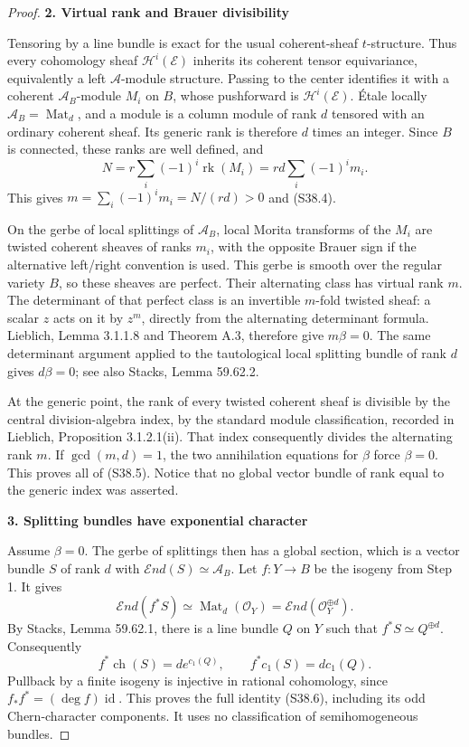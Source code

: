 \begin{proof}
\par

\medskip\noindent\textbf{2. Virtual rank and Brauer divisibility}\quad

Tensoring by a line bundle is exact for the usual coherent-sheaf \(t\)-structure. Thus every cohomology sheaf \(\mathcal H^i(\mathcal E)\) inherits its coherent tensor equivariance, equivalently a left \(\mathscr A\)-module structure. Passing to the center identifies it with a coherent \(\mathscr A_B\)-module \(M_i\) on \(B\), whose pushforward is \(\mathcal H^i(\mathcal E)\). Étale locally \(\mathscr A_B=\operatorname{Mat}_d\), and a module is a column module of rank \(d\) tensored with an ordinary coherent sheaf. Its generic rank is therefore \(d\) times an integer. Since \(B\) is connected, these ranks are well defined, and \[
 N=r\sum_i(-1)^i\operatorname{rk}(M_i)
   =rd\sum_i(-1)^i m_i.
\] This gives \(m=\sum_i(-1)^im_i=N/(rd)>0\) and (S38.4).

On the gerbe of local splittings of \(\mathscr A_B\), local Morita transforms of the \(M_i\) are twisted coherent sheaves of ranks \(m_i\), with the opposite Brauer sign if the alternative left/right convention is used. This gerbe is smooth over the regular variety \(B\), so these sheaves are perfect. Their alternating class has virtual rank \(m\). The determinant of that perfect class is an invertible \(m\)-fold twisted sheaf: a scalar \(z\) acts on it by \(z^m\), directly from the alternating determinant formula. Lieblich, Lemma 3.1.1.8 and Theorem A.3, therefore give \(m\beta=0\). The same determinant argument applied to the tautological local splitting bundle of rank \(d\) gives \(d\beta=0\); see also Stacks, Lemma 59.62.2.

At the generic point, the rank of every twisted coherent sheaf is divisible by the central division-algebra index, by the standard module classification, recorded in Lieblich, Proposition 3.1.2.1(ii). That index consequently divides the alternating rank \(m\). If \(\gcd(m,d)=1\), the two annihilation equations for \(\beta\) force \(\beta=0\). This proves all of (S38.5). Notice that no global vector bundle of rank equal to the generic index was asserted.

\par

\medskip\noindent\textbf{3. Splitting bundles have exponential character}\quad

Assume \(\beta=0\). The gerbe of splittings then has a global section, which is a vector bundle \(S\) of rank \(d\) with \(\mathcal End(S)\simeq\mathscr A_B\). Let \(f:Y\to B\) be the isogeny from Step 1. It gives \[
 \mathcal End(f^*S)\simeq\operatorname{Mat}_d(\mathcal O_Y)
                      =\mathcal End(\mathcal O_Y^{\oplus d}).
\] By Stacks, Lemma 59.62.1, there is a line bundle \(Q\) on \(Y\) such that \(f^*S\simeq Q^{\oplus d}\). Consequently \[
 f^*\operatorname{ch}(S)=d e^{c_1(Q)},\qquad
 f^*c_1(S)=d c_1(Q).
\] Pullback by a finite isogeny is injective in rational cohomology, since \(f_*f^*=(\deg f)\operatorname{id}\). This proves the full identity (S38.6), including its odd Chern-character components. It uses no classification of semihomogeneous bundles.


\end{proof}
